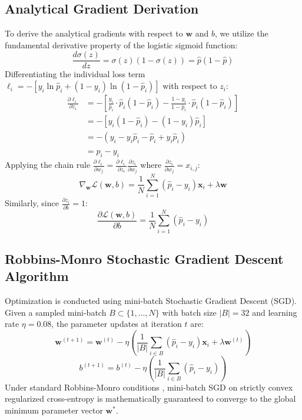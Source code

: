 \documentclass[12pt,a4paper,oneside]{report}
\begin{document}
\subsection{Analytical Gradient Derivation}
To derive the analytical gradients with respect to $\mathbf{w}$ and $b$, we utilize the fundamental derivative property of the logistic sigmoid function:
\begin{equation}
\frac{d \sigma(z)}{dz} = \sigma(z) (1 - \sigma(z)) = \hat{p} (1 - \hat{p})
\end{equation}
Differentiating the individual loss term $\ell_i = -[y_i \ln \hat{p}_i + (1 - y_i) \ln(1 - \hat{p}_i)]$ with respect to $z_i$:
\begin{align}
\frac{\partial \ell_i}{\partial z_i} &= -\left[ \frac{y_i}{\hat{p}_i} \cdot \hat{p}_i(1 - \hat{p}_i) - \frac{1 - y_i}{1 - \hat{p}_i} \cdot \hat{p}_i(1 - \hat{p}_i) \right] \nonumber \\
&= -\left[ y_i (1 - \hat{p}_i) - (1 - y_i) \hat{p}_i \right] \nonumber \\
&= -(y_i - y_i \hat{p}_i - \hat{p}_i + y_i \hat{p}_i) \nonumber \\
&= \hat{p}_i - y_i
\end{align}
Applying the chain rule $\frac{\partial \ell_i}{\partial w_j} = \frac{\partial \ell_i}{\partial z_i} \frac{\partial z_i}{\partial w_j}$ where $\frac{\partial z_i}{\partial w_j} = x_{i,j}$:
\begin{equation}
\nabla_{\mathbf{w}} \mathcal{L}(\mathbf{w}, b) = \frac{1}{N} \sum_{i=1}^N (\hat{p}_i - y_i) \mathbf{x}_i + \lambda \mathbf{w}
\end{equation}
Similarly, since $\frac{\partial z_i}{\partial b} = 1$:
\begin{equation}
\frac{\partial \mathcal{L}(\mathbf{w}, b)}{\partial b} = \frac{1}{N} \sum_{i=1}^N (\hat{p}_i - y_i)
\end{equation}

\subsection{Robbins-Monro Stochastic Gradient Descent Algorithm}
Optimization is conducted using mini-batch Stochastic Gradient Descent (SGD). Given a sampled mini-batch $B \subset \{1, \dots, N\}$ with batch size $|B| = 32$ and learning rate $\eta = 0.08$, the parameter updates at iteration $t$ are:
\begin{equation}
\mathbf{w}^{(t+1)} = \mathbf{w}^{(t)} - \eta \left( \frac{1}{|B|} \sum_{i \in B} (\hat{p}_i - y_i) \mathbf{x}_i + \lambda \mathbf{w}^{(t)} \right)
\end{equation}
\begin{equation}
b^{(t+1)} = b^{(t)} - \eta \left( \frac{1}{|B|} \sum_{i \in B} (\hat{p}_i - y_i) \right)
\end{equation}
Under standard Robbins-Monro conditions \cite{robbins1951}, mini-batch SGD on strictly convex regularized cross-entropy is mathematically guaranteed to converge to the global minimum parameter vector $\mathbf{w}^*$.
\end{document}
